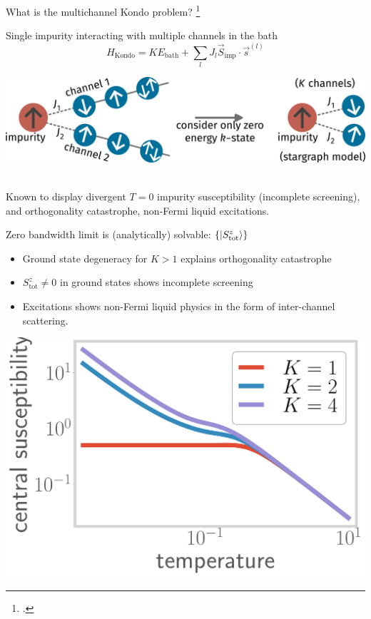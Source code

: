 \documentclass[aspectratio=169]{beamer}
\begin{document}
\begin{frame}{What is the multichannel Kondo problem?}
\footcite{Noz_blandin_1980,affleck1993exact,emery_kivelson,andrei_destri_1984}
\begin{minipage}{0.39\textwidth}
Single impurity interacting with \alert{multiple channels} in the bath
\[H_\text{Kondo} = KE_\text{bath} + \sum_{l}J_l \vec{S}_\text{imp}\cdot\vec{s}^{(l)}\]
\end{minipage}
\hspace*{\fill}
\begin{minipage}{0.59\textwidth}
\includegraphics[width=\textwidth]{MCKM_zeroB.pdf}
\end{minipage}\\[10pt]
Known to display divergent \(T=0\) impurity susceptibility (incomplete screening), and orthogonality catastrophe, \alert{non-Fermi liquid} excitations.\\[10pt]
\begin{minipage}{0.64\textwidth}
Zero bandwidth limit is (analytically) solvable: \(\left\{\ket{S_\text{tot}^z}\right\}\)\\
\begin{itemize}
	\item Ground state degeneracy for \(K > 1\) explains \alert{orthogonality catastrophe}\\[5pt]
\item \(S_\text{tot}^z \neq 0\) in ground states shows incomplete screening\\[5pt]
\item Excitations shows \alert{non-Fermi liquid} physics in the form of inter-channel scattering.
\end{itemize}
\end{minipage}
\begin{minipage}{0.35\textwidth}
\includegraphics[width=\textwidth]{MCK_imp_chi.pdf}
\end{minipage}


\end{frame}
\end{document}
